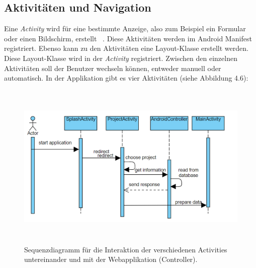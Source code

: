\subsection{Aktivitäten und Navigation}
Eine \textit{Activity} wird für eine bestimmte Anzeige, also zum Beispiel ein Formular oder einen Bildschirm, erstellt ~\parencite{mednieks2012programming}. Diese Aktivitäten werden im Android Manifest registriert. Ebenso kann zu den Aktivitäten eine Layout-Klasse erstellt werden. Diese Layout-Klasse wird in der \textit{Activity} registriert. Zwischen den einzelnen Aktivitäten soll der Benutzer wechseln können, entweder manuell oder automatisch. In der Applikation gibt es vier Aktivitäten (siehe Abbildung 4.6):
\begin{figure}[tp]
  \centering
  \includegraphics[height=8cm]{images/seqAct.PNG}
 \caption[Sequenzdiagramm für die Interaktion der verschiedenen Activities untereinander und mit der Webapplikation.]{Sequenzdiagramm für die Interaktion der verschiedenen Activities untereinander und mit der Webapplikation (Controller).}
  \label{fig:popup}
\end{figure}
